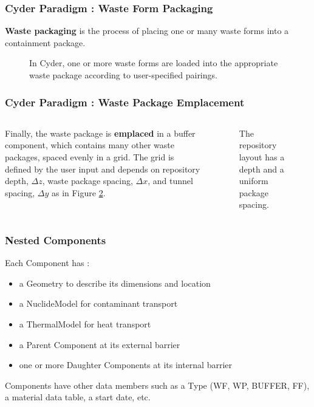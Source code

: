 \begin{frame}[ctb!]
  \frametitle{Cyder Paradigm : Waste Form Packaging}
  \footnotesize{

    \textbf{Waste packaging} is the process of placing one or many waste forms into a 
containment package. 

\begin{figure}[htbp!]
\begin{center}
\def\svgwidth{.5\textwidth}

\end{center}
\caption{In Cyder, one or more waste forms are loaded into the appropriate 
waste package according to user-specified pairings.}
\label{fig:wf_packaging}
\end{figure}
}
\end{frame}

\begin{frame}[ctb!]
  \frametitle{Cyder Paradigm : Waste Package Emplacement}
\footnotesize{
  \begin{columns}[c]
Finally, the waste package is \textbf{emplaced} in a buffer component, which 
contains many other waste packages, spaced evenly in a grid. The grid is 
defined by the user input and depends on repository depth, $\Delta z$, waste 
package spacing, $\Delta x$, and tunnel spacing, $\Delta y$ as in Figure 
\ref{fig:repo_layout}.

\begin{figure}[htbp!]
\begin{center}
\def\svgwidth{.5\textwidth}

\end{center}
\caption{The repository layout has a depth and a uniform package spacing.}
\label{fig:repo_layout}
\end{figure}
\end{columns}
  }
\end{frame}


\begin{frame}
  \frametitle{Nested Components}
  Each Component has : 
  \begin{itemize}
    \item a Geometry to describe its dimensions and location
    \item a NuclideModel for contaminant transport 
    \item a ThermalModel for heat transport
    \item a Parent Component at its external barrier
    \item one or more Daughter Components at its internal barrier
  \end{itemize}

  Components have other data members such as a Type (WF, WP, BUFFER, FF), a 
  material data table, a start date, etc. 
\end{frame}

